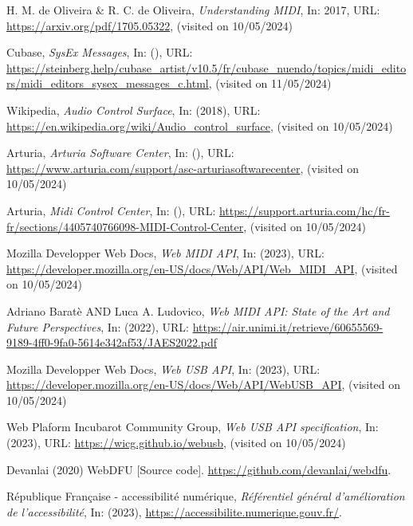 \documentclass[francais]{rapportPFE}  %
\begin{document}
\begin{thebibliography}{9}

      H. M. de Oliveira \& R. C. de Oliveira,
      \textit{Understanding MIDI},
      In: 2017,
      URL: \url{https://arxiv.org/pdf/1705.05322},
      (visited on 10/05/2024)

        Cubase,
        \textit{SysEx Messages},
        In: (),
        URL: \url{https://steinberg.help/cubase_artist/v10.5/fr/cubase_nuendo/topics/midi_editors/midi_editors_sysex_messages_c.html},
        (visited on 11/05/2024)
    
        Wikipedia,
        \textit{Audio Control Surface},
        In: (2018),
        URL: \url{https://en.wikipedia.org/wiki/Audio_control_surface},
        (visited on 10/05/2024)

        Arturia,
        \textit{Arturia Software Center},
        In: (),
        URL: \url{https://www.arturia.com/support/asc-arturiasoftwarecenter},
        (visited on 10/05/2024)

        Arturia,
        \textit{Midi Control Center},
        In: (),
        URL: \url{https://support.arturia.com/hc/fr-fr/sections/4405740766098-MIDI-Control-Center},
        (visited on 10/05/2024)

        Mozilla Developper Web Docs,
        \textit{Web MIDI API},
        In: (2023),
        URL: \url{https://developer.mozilla.org/en-US/docs/Web/API/Web_MIDI_API},
        (visited on 10/05/2024)

    Adriano Baratè AND Luca A. Ludovico,
        \textit{Web MIDI API: State of the Art and Future
        Perspectives},
        In: (2022),
        URL: \url{https://air.unimi.it/retrieve/60655569-9189-4ff0-9fa0-5614e342af53/JAES2022.pdf}

    

    Mozilla Developper Web Docs,
    \textit{Web USB API},
    In: (2023),
        URL: \url{https://developer.mozilla.org/en-US/docs/Web/API/WebUSB_API},
        (visited on 10/05/2024)
    
    
        Web Plaform Incubarot Community Group,
        \textit{Web USB API specification},
        In: (2023),
        URL: \url{https://wicg.github.io/webusb},
        (visited on 10/05/2024)

    
    
    
        Devanlai (2020) WebDFU [Source code]. \url{https://github.com/devanlai/webdfu}.


    
    République Française - accessibilité numérique,
    \textit{Référentiel général d’amélioration de l’accessibilité},
    In: (2023),
    \url{https://accessibilite.numerique.gouv.fr/}.
        
\end{thebibliography}
\end{document}

